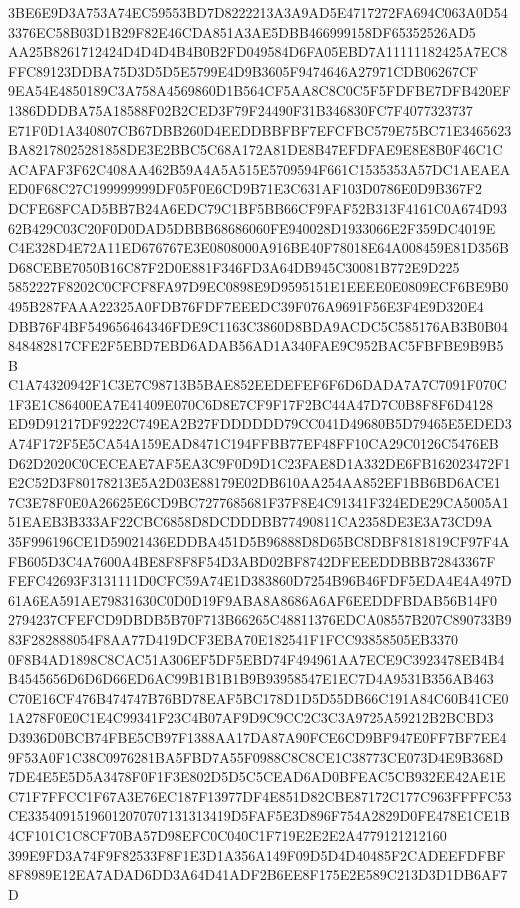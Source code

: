 \documentclass[UTF8,fontset=fandol,zihao=-4,a4paper]{ctexart}
\begin{document}
{{3BE6E9D3A753A74EC59553BD7D8222213A3A9AD5E4717272FA694C063A0D543376EC58B03D1B29F82E46CDA851A3AE5DBB466999158DF65352526AD5
AA25B8261712424D4D4D4B4B0B2FD049584D6FA05EBD7A11111182425A7EC8FFC89123DDBA75D3D5D5E5799E4D9B3605F9474646A27971CDB06267CF
9EA54E4850189C3A758A4569860D1B564CF5AA8C8C0C5F5FDFBE7DFB420EF1386DDDBA75A18588F02B2CED3F79F24490F31B346830FC7F4077323737
E71F0D1A340807CB67DBB260D4EEDDBBFBF7EFCFBC579E75BC71E3465623BA82178025281858DE3E2BBC5C68A172A81DE8B47EFDFAE9E8E8B0F46C1C
ACAFAF3F62C408AA462B59A4A5A515E5709594F661C1535353A57DC1AEAEAED0F68C27C199999999DF05F0E6CD9B71E3C631AF103D0786E0D9B367F2
DCFE68FCAD5BB7B24A6EDC79C1BF5BB66CF9FAF52B313F4161C0A674D9362B429C03C20F0D0DAD5DBBB68686060FE940028D1933066E2F359DC4019E
C4E328D4E72A11ED676767E3E0808000A916BE40F78018E64A008459E81D356BD68CEBE7050B16C87F2D0E881F346FD3A64DB945C30081B772E9D225
5852227F8202C0CFCF8FA97D9EC0898E9D9595151E1EEEE0E0809ECF6BE9B0495B287FAAA22325A0FDB76FDF7EEEDC39F076A9691F56E3F4E9D320E4
DBB76F4BF549656464346FDE9C1163C3860D8BDA9ACDC5C585176AB3B0B04848482817CFE2F5EBD7EBD6ADAB56AD1A340FAE9C952BAC5FBFBE9B9B5B
C1A74320942F1C3E7C98713B5BAE852EEDEFEF6F6D6DADA7A7C7091F070C1F3E1C86400EA7E41409E070C6D8E7CF9F17F2BC44A47D7C0B8F8F6D4128
ED9D91217DF9222C749EA2B27FDDDDDD79CC041D49680B5D79465E5EDED3A74F172F5E5CA54A159EAD8471C194FFBB77EF48FF10CA29C0126C5476EB
D62D2020C0CECEAE7AF5EA3C9F0D9D1C23FAE8D1A332DE6FB162023472F1E2C52D3F80178213E5A2D03E88179E02DB610AA254AA852EF1BB6BD6ACE1
7C3E78F0E0A26625E6CD9BC7277685681F37F8E4C91341F324EDE29CA5005A151EAEB3B333AF22CBC6858D8DCDDDBB77490811CA2358DE3E3A73CD9A
35F996196CE1D59021436EDDBA451D5B96888D8D65BC8DBF8181819CF97F4AFB605D3C4A7600A4BE8F8F8F54D3ABD02BF8742DFEEEDDBBB72843367F
FEFC42693F3131111D0CFC59A74E1D383860D7254B96B46FDF5EDA4E4A497D61A6EA591AE79831630C0D0D19F9ABA8A8686A6AF6EEDDFBDAB56B14F0
2794237CFEFCD9DBDB5B70F713B66265C48811376EDCA08557B207C890733B983F282888054F8AA77D419DCF3EBA70E182541F1FCC93858505EB3370
0F8B4AD1898C8CAC51A306EF5DF5EBD74F494961AA7ECE9C3923478EB4B4B4545656D6D6D66ED6AC99B1B1B1B9B93958547E1EC7D4A9531B356AB463
C70E16CF476B474747B76BD78EAF5BC178D1D5D55DB66C191A84C60B41CE01A278F0E0C1E4C99341F23C4B07AF9D9C9CC2C3C3A9725A59212B2BCBD3
D3936D0BCB74FBE5CB97F1388AA17DA87A90FCE6CD9BF947E0FF7BF7EE49F53A0F1C38C0976281BA5FBD7A55F0988C8C8CE1C38773CE073D4E9B368D
7DE4E5E5D5A3478F0F1F3E802D5D5C5CEAD6AD0BFEAC5CB932EE42AE1EC71F7FFCC1F67A3E76EC187F13977DF4E851D82CBE87172C177C963FFFFC53
CE33540915196012070707131313419D5FAF5E3D896F754A2829D0FE478E1CE1B4CF101C1C8CF70BA57D98EFC0C040C1F719E2E2E2A4779121212160
399E9FD3A74F9F82533F8F1E3D1A356A149F09D5D4D40485F2CADEEFDFBF8F8989E12EA7ADAD6DD3A64D41ADF2B6EE8F175E2E589C213D3D1DB6AF7D
}}
\end{document}
